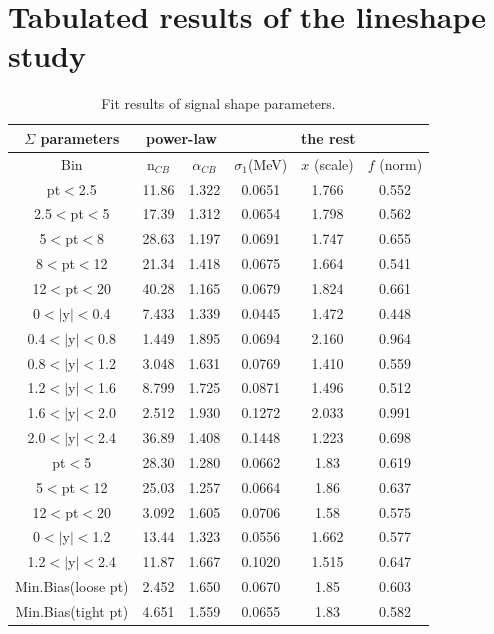 \section{Tabulated results of the lineshape study}

\begin{table}

    \begin{tabular}{c|c|c|c|c|c}
      \hline
      $\Sigma$ parameters &  \multicolumn{2}{c}{power-law} \vline& \multicolumn{3}{c}{the rest}  \\                                               
      \hline
      Bin & n$_{CB}$ & $\alpha_{CB}$ & $\sigma_{1}$(MeV) & $x$ (scale) & $f$ (norm) \\  
      \hline                                                                                                   
      pt$<$2.5    &11.86  & 1.322  & 0.0651  & 1.766  & 0.552 \\ 
      2.5$<$pt$<$5&17.39  & 1.312  & 0.0654  & 1.798  & 0.562\\ 
      5$<$pt$<$8  &28.63  & 1.197  & 0.0691  & 1.747  & 0.655 \\ 
      8$<$pt$<$12 &21.34  & 1.418  & 0.0675  & 1.664  & 0.541 \\ 
      12$<$pt$<$20&40.28  & 1.165  & 0.0679  & 1.824  & 0.661 \\ 
      \hline
      0$<|$y$|<$0.4  &7.433  & 1.339  & 0.0445 & 1.472  & 0.448 \\ 
      0.4$<|$y$|<$0.8&1.449  & 1.895  & 0.0694 & 2.160  & 0.964 \\ 
      0.8$<|$y$|<$1.2&3.048  & 1.631  & 0.0769 & 1.410  & 0.559 \\ 
      1.2$<|$y$|<$1.6&8.799  & 1.725  & 0.0871 & 1.496  & 0.512 \\ 
      1.6$<|$y$|<$2.0&2.512  & 1.930  & 0.1272 & 2.033  & 0.991 \\
      2.0$<|$y$|<$2.4&36.89  & 1.408  & 0.1448 & 1.223  & 0.698\\ 
      \hline
      pt$<$5       &28.30  & 1.280  & 0.0662  & 1.83 & 0.619\\
      5$<$pt$<$12  &25.03  & 1.257  & 0.0664  & 1.86 & 0.637 \\ 
      12$<$pt$<$20 &3.092  & 1.605  & 0.0706  & 1.58 & 0.575\\ 
      \hline
      0$<|$y$|<$1.2  &13.44  & 1.323 & 0.0556 & 1.662  & 0.577\\ 
      1.2$<|$y$|<$2.4&11.87  & 1.667 & 0.1020 & 1.515  & 0.647\\ 
      \hline
      Min.Bias(loose pt) & 2.452 & 1.650  & 0.0670  & 1.85 & 0.603 \\ 
      Min.Bias(tight pt) & 4.651 & 1.559  & 0.0655  & 1.83 & 0.582 \\ 
      \hline
\end{tabular}

\caption{Fit results of signal shape parameters.} 
\label{tab:FSRparameters}
 \end{table}
